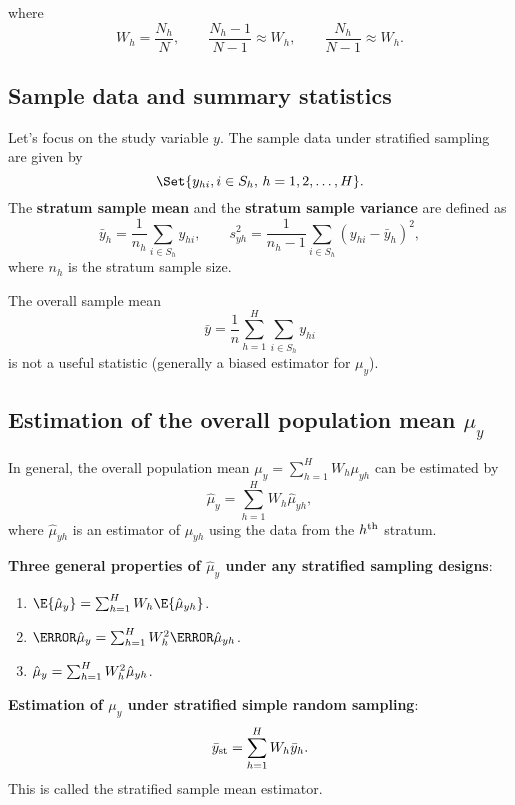 where
\[ W_h=\frac{N_h}{N},\qquad \frac{N_h-1}{N-1}\approx W_h,\qquad \frac{N_h}{N-1}\approx W_h. \]
\subsection{Sample data and summary statistics}

Let's focus on the study variable $y$. The sample data under stratified
sampling are given by
\[ \Set{y_{hi}, i\in S_h,\, h=1,2,\ldots,H}. \]
The \textbf{stratum sample mean} and the \textbf{stratum sample variance} are
defined as
\[ \bar{y}_h=\frac{1}{n_h}\sum_{i\in S_h}y_{hi},\qquad s_{yh}^2=\frac{1}{n_h-1}\sum_{i\in S_h}(y_{hi}-\bar{y}_h)^2, \]
where $ n_h $ is the stratum sample size.

The overall sample mean
\[ \bar{y}=\frac{1}{n}\sum_{h=1}^{H}\sum_{i\in S_h}y_{hi} \]
is not a useful statistic (generally a biased estimator for $ \mu_y $).

\subsection{Estimation of the overall population mean \texorpdfstring{$\mu_y$}{μy}}

In general, the overall population mean $ \mu_y=\sum_{h=1}^{H}W_h \mu_{yh} $ can be estimated by
\[ \hat{\mu}_y=\sum_{h=1}^{H}W_h\hat{\mu}_{yh}, \]
where $ \hat{\mu}_{yh} $ is an estimator of $ \mu_{yh} $ using the data from the $ h\textsuperscript{th} $
stratum.

\textbf{Three general properties of $ \hat{\mu}_{y} $ under any stratified sampling
      designs}:
\begin{enumerate}
      \item $ \E{\hat{\mu}_y}=\sum_{h=1}^{H}W_h \E{\hat{\mu}_{yh}} $.
      \item $ \V{\hat{\mu}_y}=\sum_{h=1}^{H}W_h^2\V{\hat{\mu}_{yh}} $.
      \item $ \relax{\hat{\mu}_y}=\sum_{h=1}^{H}W_h^2\relax{\hat{\mu}_{yh}} $.
\end{enumerate}
\textbf{Estimation of $ \mu_y $ under stratified simple random sampling}:
\[ \bar{y}_{\text{st}}=\sum_{h=1}^{H}W_h\bar{y}_h. \]
This is called the stratified sample mean estimator.

